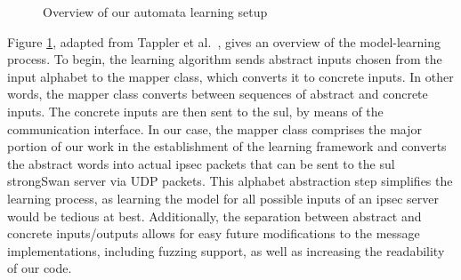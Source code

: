 \begin{figure}[h]
	\caption{Overview of our automata learning setup}
	\label{fig:AALSetup}
\end{figure}

Figure \ref{fig:AALSetup}, adapted from Tappler et al.~\cite{tappler2017}, gives an overview of the model-learning process. To begin, the learning algorithm sends abstract inputs chosen from the input alphabet to the mapper class, which converts it to concrete inputs. In other words, the mapper class converts between sequences of abstract and concrete inputs. The concrete inputs are then sent to the \ac{sul}, by means of the communication interface. In our case, the mapper class comprises the major portion of our work in the establishment of the learning framework and converts the abstract words into actual \ac{ipsec} packets that can be sent to the \ac{sul} strongSwan server via UDP packets. This alphabet abstraction step simplifies the learning process, as learning the model for all possible inputs of an \ac{ipsec} server would be tedious at best. Additionally, the separation between abstract and concrete inputs/outputs allows for easy future modifications to the message implementations, including fuzzing support, as well as increasing the readability of our code. 

